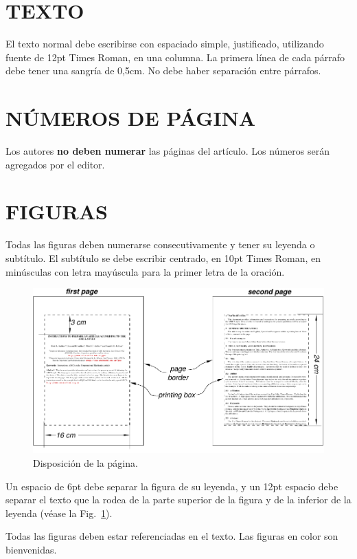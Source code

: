 \documentclass[oneside,a4paper,spanish,links]{amca}
\begin{document}
\section{TEXTO}

El texto normal debe escribirse con espaciado simple, justificado,
utilizando fuente de 12pt Times Roman, en una columna. La primera
línea de cada párrafo debe tener una sangría de 0,5cm. No debe
haber separación entre párrafos.

\section{NÚMEROS DE PÁGINA}

Los autores {\bf no deben numerar} las páginas del artículo. Los
números serán agregados por el editor.

\section{FIGURAS}

Todas las figuras deben numerarse consecutivamente y tener su
leyenda o subtítulo. El subtítulo se debe escribir centrado, en
10pt Times Roman, en minúsculas con letra mayúscula para la primer
letra de la oración.

\begin{figure}[htb]
\centerline{\includegraphics{firstpage}} \caption{Disposición de
la página.} \label{fg:figura}
\end{figure}

Un espacio de 6pt debe separar la figura de su leyenda, y un 12pt
espacio debe separar el texto que la rodea de la parte superior de
la figura y de la inferior de la leyenda (véase la
Fig.~\ref{fg:figura}).

Todas las figuras deben estar referenciadas en el texto. Las
figuras en color son bienvenidas.
\end{document}
